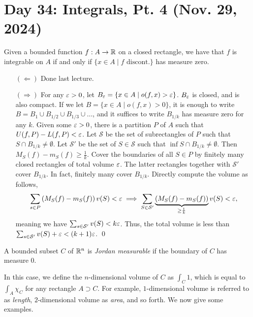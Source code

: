 \section{Day 34: Integrals, Pt. 4 (Nov. 29, 2024)}
\begin{simplethm}
    Given a bounded function $f : A \to \mathbb R$ on a closed rectangle, we have that $f$ is integrable on $A$ if and only if $\{x \in A \mid f \text{ discont.}\}$ has measure zero.
\end{simplethm}
\begin{itemize}
    \item[$(\Leftarrow)$] Done last lecture.
    \item[$(\Rightarrow)$] For any $\varepsilon > 0$, let $B_\varepsilon = \{x \in A \mid o(f, x) > \varepsilon\}$. $B_\varepsilon$ is closed, and is also compact. If we let $B = \{x \in A \mid o(f, x) > 0\}$, it is enough to write $B = B_1 \cup B_{1/2} \cup B_{1/3} \cup \dots$, and it suffices to write $B_{1/k}$ has measure zero for any $k$.
    \medskip\newline
    Given some $\varepsilon > 0$, there is a partition $P$ of $A$ such that $U(f, P) - L(f, P) < \varepsilon$. Let $\mathcal{S}$ be the set of subrectangles of $P$ such that $S \cap B_{1/k} \neq \emptyset$. Let $\mathcal{S}'$ be the set of $S \in \mathcal{S}$ such that $\inf S \cap B_{1/k} \neq \emptyset$. Then $M_S(f) - m_S(f) \geq \frac{1}{k}$. Cover the boundaries of all $S \in P$ by finitely many closed rectangles of total volume $\varepsilon$. The latter rectangles together with $\mathcal{S}'$ cover $B_{1/k}$. In fact, finitely many cover $B_{1/k}$. Directly compute the volume as follows,
    \[ \sum_{s \in P} \left(M_S(f) - m_S(f)\right) v(S) < \varepsilon \implies \sum_{S \in \mathcal{S}'} \underbrace{\left(M_S(f) - m_S(f)\right)}_{\geq \frac{1}{k}} v(S) < \varepsilon, \]
    meaning we have $\sum_{s \in \mathcal{S}'} v(S) < k \varepsilon$. Thus, the total volume is less than $\sum_{s \in \mathcal{S}'} v(S) + \varepsilon < (k + 1)\varepsilon$. \qed
\end{itemize}
\begin{definition}
    A bounded subset $C$ of $\mathbb R^n$ is \textit{Jordan measurable} if the boundary of $C$ has measure $0$.
\end{definition}
\noindent In this case, we define the $n$-dimensional volume of $C$ as $\int_C 1$, which is equal to $\int_A \chi_C$ for any rectangle $A \supset C$. For example, $1$-dimensional volume is referred to as \textit{length}, $2$-dimensional volume as \textit{area}, and so forth. We now give some examples.
